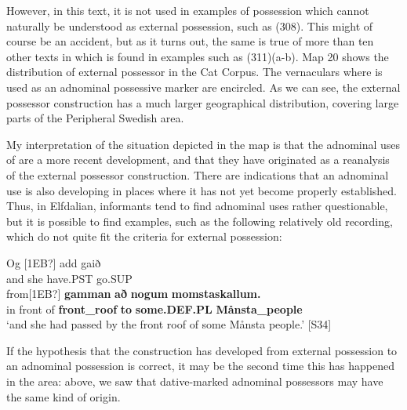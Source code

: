 {%
However, in this text, it is not used in examples of possession which cannot naturally be understood as external possession, such as (308). This might of course be an accident, but as it turns out, the same is true of more than ten other texts in which  is found in examples such as (311)(a-b). Map 20 shows the distribution of external possessor  in the Cat Corpus. The vernaculars where  is used as an adnominal possessive marker are encircled. As we can see, the external possessor construction has a much larger geographical distribution, covering large parts of the Peripheral Swedish area. 


My interpretation of the situation depicted in the map is that the adnominal uses of are a more recent development, and that they have originated as a reanalysis of the external possessor construction. There are indications that an adnominal use is also developing in places where it has not yet become properly established. Thus, in Elfdalian, informants tend to find adnominal uses rather questionable, but it is possible to find examples, such as the following relatively old recording, which do not quite fit the criteria for external possession: 


\ea\label{}
\gll Og  [1EB?]  add  gaið\\
and  she  have.PST  go.SUP\\
\gll from[1EB?]  \textbf{gamman} \textbf{að} \textbf{nogum} \textbf{momstaskallum.}\\
in front of   \textbf{front\_roof} \textbf{to} \textbf{some.DEF.PL} \textbf{Månsta\_people}\\
\glt ‘and she had passed by the front roof of some Månsta people.’ [S34]
\z

If the hypothesis that the  construction has developed from external possession to an adnominal possession is correct, it may be the second time this has happened in the area: above, we saw that dative-marked adnominal possessors may have the same kind of origin. 

}
